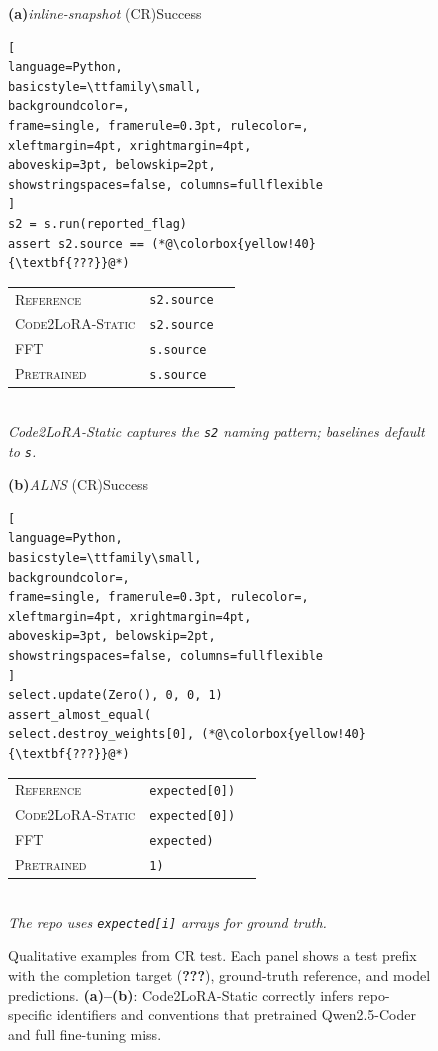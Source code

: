 \documentclass{llmxive}
\providecommand{\codelora}{Code2LoRA\xspace}
\providecommand{\codelorastatic}{\codelora-Static\xspace}
\begin{document}
\begin{figure}[t]
\begin{center}
\begin{minipage}[t]{0.48\textwidth}
\noindent\textbf{(a)}\;\textit{inline-snapshot} (CR)\hfill Success
\begin{lstlisting}[
language=Python,
basicstyle=\ttfamily\small,
backgroundcolor=,
frame=single, framerule=0.3pt, rulecolor=,
xleftmargin=4pt, xrightmargin=4pt,
aboveskip=3pt, belowskip=2pt,
showstringspaces=false, columns=fullflexible
]
s2 = s.run(reported_flag)
assert s2.source == (*@\colorbox{yellow!40}{\textbf{???}}@*)
\end{lstlisting}
\vspace{1pt}
\begin{tabular}{@{}l@{\;\;}l@{\;\;}c@{}}
{\scriptsize\textsc{Reference}} & \texttt{s2.source} & \\
{\scriptsize\textsc{\codelorastatic{}}} & \texttt{s2.source} &  \\
{\scriptsize\textsc{FFT}} & \texttt{s.source} &  \\
{\scriptsize\textsc{Pretrained}} & \texttt{s.source} &  \\
\end{tabular}\\[2pt]
{\scriptsize\itshape \codelorastatic{} captures the \texttt{s2} naming pattern; baselines default to \texttt{s}.}
\end{minipage}\hfill
\begin{minipage}[t]{0.48\textwidth}
\noindent\textbf{(b)}\;\textit{ALNS} (CR)\hfill Success
\begin{lstlisting}[
language=Python,
basicstyle=\ttfamily\small,
backgroundcolor=,
frame=single, framerule=0.3pt, rulecolor=,
xleftmargin=4pt, xrightmargin=4pt,
aboveskip=3pt, belowskip=2pt,
showstringspaces=false, columns=fullflexible
]
select.update(Zero(), 0, 0, 1)
assert_almost_equal(
select.destroy_weights[0], (*@\colorbox{yellow!40}{\textbf{???}}@*)
\end{lstlisting}
\vspace{1pt}
\begin{tabular}{@{}l@{\;\;}l@{\;\;}c@{}}
{\scriptsize\textsc{Reference}} & \texttt{expected[0])} & \\
{\scriptsize\textsc{\codelorastatic{}}} & \texttt{expected[0])} &  \\
{\scriptsize\textsc{FFT}} & \texttt{expected)} &  \\
{\scriptsize\textsc{Pretrained}} & \texttt{1)} &  \\
\end{tabular}\\[2pt]
{\scriptsize\itshape The repo uses \texttt{expected[i]} arrays for ground truth.}
\end{minipage}

\caption{Qualitative examples from CR test. Each panel shows a test prefix with the completion target (\colorbox{yellow!30}{\textbf{???}}), ground-truth reference, and model predictions.
\textbf{(a)--(b)}: \codelorastatic{} correctly infers repo-specific identifiers and conventions that pretrained Qwen2.5-Coder and full fine-tuning miss.}
\label{fig:qualitative}
\end{center}
\end{figure}
\end{document}

